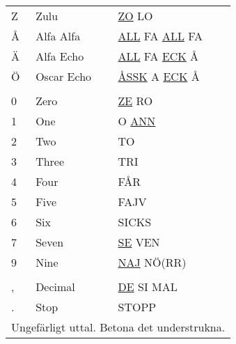\begin{table}[htbp]
\begin{tabular}{lll}
    Z & Zulu & \underline{ZO} LO \\
    Å & Alfa Alfa & \underline{ALL} FA \underline{ALL} FA \\
    Ä & Alfa Echo & \underline{ALL} FA \underline{ECK} Å \\
    Ö & Oscar Echo & \underline{ÅSSK} A \underline{ECK} Å \\
    & & \\
    0 & Zero & \underline{ZE} RO \\
    1 & One & O \underline{ANN} \\
    2 & Two & TO \\
    3 & Three & TRI \\
    4 & Four & FÅR \\
    5 & Five & FAJV \\
    6 & Six & SICKS \\
    7 & Seven & \underline{SE} VEN \\
    9 & Nine & \underline{NAJ} NÖ(RR) \\
    & & \\
    , & Decimal & \underline{DE} SI MAL \\
    . & Stop & STOPP \\
    \multicolumn{3}{l}{Ungefärligt uttal. Betona det understrukna.}
  \end{tabular}
\end{table}



